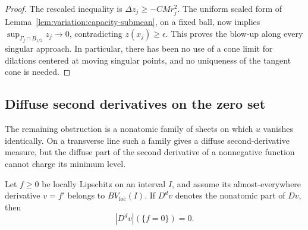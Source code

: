 \begin{proof}
The rescaled inequality is $\Delta z_j\geq-CMr_j^2$.
The uniform scaled form of
Lemma~\ref{lem:variation:capacity-submean}, on a fixed ball, now
implies $\sup_{\Gamma_j\cap B_{1/2}}z_j\to0$, contradicting
$z(x_j)\geq\epsilon$.  This proves the blow-up along every singular
approach.  In particular, there has been no use of a cone limit for
dilations centered at moving singular points, and no uniqueness of
the tangent cone is needed.
\end{proof}

\subsection{Diffuse second derivatives on the zero set}

The remaining obstruction is a nonatomic family of sheets on which
$u$ vanishes identically. On a transverse line such a family gives
a diffuse second-derivative measure, but the diffuse part of the
second derivative of a nonnegative function cannot charge its
minimum level.

\begin{lemma}
\label{lem:variation:diffuse-bv-minima}
Let $f\geq0$ be locally Lipschitz on an interval $I$, and assume its
almost-everywhere derivative $v=f'$ belongs to
$BV_{\mathrm{loc}}(I)$.  If $D^dv$ denotes the nonatomic part of
$Dv$, then
\[
 |D^dv|(\{f=0\})=0.
\]
\end{lemma}

